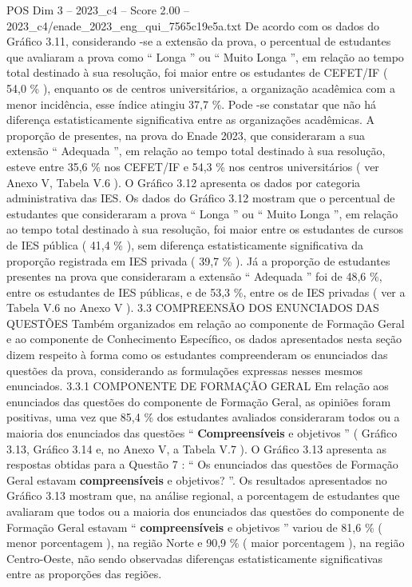 \begin{textsample}{POS Dim 3 – 2023\_c4 – Score 2.00 – 2023\_c4/enade\_2023\_eng\_qui\_7565c19e5a.txt}
De acordo com os dados do Gráfico 3.11, considerando -se a extensão da prova, o percentual de estudantes que avaliaram a prova como “ Longa ” ou “ Muito Longa ”, em relação ao tempo total destinado à sua resolução, foi maior entre os estudantes de CEFET/IF ( 54,0 \% ), enquanto os de centros universitários, a organização acadêmica com a menor incidência, esse índice atingiu 37,7 \%.
Pode -se constatar que não há diferença estatisticamente significativa entre as organizações acadêmicas.
A proporção de presentes, na prova do Enade 2023, que consideraram a sua extensão “ Adequada ”, em relação ao tempo total destinado à sua resolução, esteve entre 35,6 \% nos CEFET/IF e 54,3 \% nos centros universitários ( ver Anexo V, Tabela V.6 ).
O Gráfico 3.12 apresenta os dados por categoria administrativa das IES.
Os dados do Gráfico 3.12 mostram que o percentual de estudantes que consideraram a prova “ Longa ” ou “ Muito Longa ”, em relação ao tempo total destinado à sua resolução, foi maior entre os estudantes de cursos de IES pública ( 41,4 \% ), sem diferença estatisticamente significativa da proporção registrada em IES privada ( 39,7 \% ).
Já a proporção de estudantes presentes na prova que consideraram a extensão “ Adequada ” foi de 48,6 \%, entre os estudantes de IES públicas, e de 53,3 \%, entre os de IES privadas ( ver a Tabela V.6 no Anexo V ). 3.3 COMPREENSÃO DOS ENUNCIADOS DAS QUESTÕES Também organizados em relação ao componente de Formação Geral e ao componente de Conhecimento Específico, os dados apresentados nesta seção dizem respeito à forma como os estudantes compreenderam os enunciados das questões da prova, considerando as formulações expressas nesses mesmos enunciados. 3.3.1 COMPONENTE DE FORMAÇÃO GERAL Em relação aos enunciados das questões do componente de Formação Geral, as opiniões foram positivas, uma vez que 85,4 \% dos estudantes avaliados consideraram todos ou a maioria dos enunciados das questões “ \textbf{Compreensíveis} e objetivos ” ( Gráfico 3.13, Gráfico 3.14 e, no Anexo V, a Tabela V.7 ).
O Gráfico 3.13 apresenta as respostas obtidas para a Questão 7 : “ Os enunciados das questões de Formação Geral estavam \textbf{compreensíveis} e objetivos? ”.
Os resultados apresentados no Gráfico 3.13 mostram que, na análise regional, a porcentagem de estudantes que avaliaram que todos ou a maioria dos enunciados das questões do componente de Formação Geral estavam “ \textbf{compreensíveis} e objetivos ” variou de 81,6 \% ( menor porcentagem ), na região Norte e 90,9 \% ( maior porcentagem ), na região Centro-Oeste, não sendo observadas diferenças estatisticamente significativas entre as proporções das regiões.

\end{textsample}
